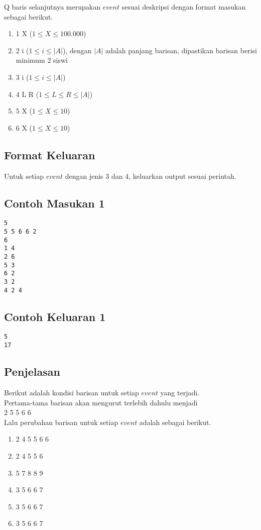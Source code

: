 \documentclass{article}
\begin{document}
Q baris selanjutnya merupakan $event$ sesuai deskripsi dengan format masukan sebagai berikut.

\begin{enumerate}
    \item 1 X ($1 \leq X \leq 100.000$)
    \item 2 i ($1 \leq i \leq |A|$), dengan $|A|$ adalah panjang barisan, dipastikan barisan berisi minimum 2 siswi
    \item 3 i ($1 \leq i \leq |A|$)
    \item 4 L R ($1 \leq L \leq R \leq |A|$)
    \item 5 X ($1 \leq X \leq 10$)
    \item 6 X ($1 \leq X \leq 10$)
\end{enumerate}

\subsection*{Format Keluaran}

Untuk setiap $event$ dengan jenis 3 dan 4, keluarkan output sesuai perintah.


\begin{multicols}{2}
\subsection*{Contoh Masukan 1}
\begin{lstlisting}
5
5 5 6 6 2
6
1 4
2 6
5 3
6 2
3 2
4 2 4
\end{lstlisting}
\columnbreak
\subsection*{Contoh Keluaran 1}
\begin{lstlisting}
5
17
\end{lstlisting}
\vfill
\null
\end{multicols}


\subsection*{Penjelasan}

Berikut adalah kondisi barisan untuk setiap $event$ yang terjadi.\\
Pertama-tama barisan akan mengurut terlebih dahulu menjadi\\
2 5 5 6 6\\
Lalu perubahan barisan untuk setiap $event$ adalah sebagai berikut.
\begin{enumerate}
    \item 2 4 5 5 6 6
    \item 2 4 5 5 6
    \item 5 7 8 8 9
    \item 3 5 6 6 7
    \item 3 5 6 6 7
    \item 3 5 6 6 7
\end{enumerate}
\end{document}
